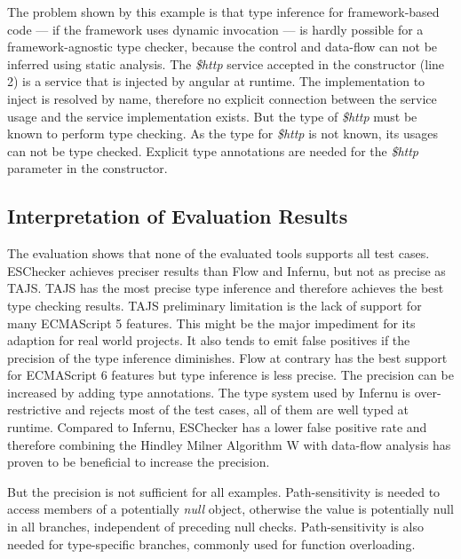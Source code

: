 
The problem shown by this example is that type inference for framework-based code --- if the framework uses dynamic invocation --- is  hardly possible for a framework-agnostic type checker, because the control and data-flow can not be inferred using static analysis. The \textit{\$http} service accepted in the constructor (line 2) is a service that is injected by angular at runtime. The implementation to inject is resolved by name, therefore no explicit connection between the service usage and the service implementation exists. But the type of \textit{\$http} must be known to perform type checking. As the type for \textit{\$http} is not known, its usages can not be type checked. Explicit type annotations are needed for the \textit{\$http} parameter in the constructor. 

\subsection{Interpretation of Evaluation Results}
The evaluation shows that none of the evaluated tools supports all test cases. ESChecker achieves preciser results than Flow and Infernu, but not as precise as TAJS. TAJS has the most precise type inference and therefore achieves the best type checking results. TAJS preliminary limitation is the lack of support for many ECMAScript 5 features. This might be the major impediment for its adaption for real world projects. It also tends to emit false positives if the precision of the type inference diminishes. Flow at contrary has the best support for ECMAScript 6 features but type inference is less precise. The precision can be increased by adding type annotations. The type system used by Infernu is over-restrictive and rejects most of the test cases, all of them are well typed at runtime. Compared to Infernu, ESChecker has a lower false positive rate and therefore combining the Hindley Milner Algorithm W with data-flow analysis has proven to be beneficial to increase the precision. 

But the precision is not sufficient for all examples. Path-sensitivity is needed to access members of a potentially \textit{null} object, otherwise the value is potentially null in all branches, independent of preceding null checks. Path-sensitivity is also needed for type-specific branches, commonly used for function overloading.

